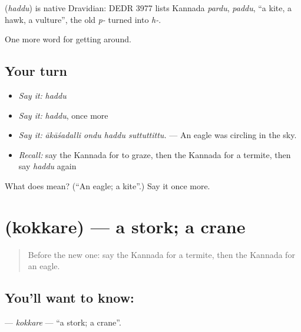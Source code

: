 \begin{cousinweb}
\textbf{} (\emph{haddu}) is native Dravidian: DEDR 3977 lists Kannada \emph{pardu}, \emph{paddu}, \textquotedblleft{}a kite, a hawk, a vulture\textquotedblright{}, the old \emph{p-} turned into \emph{h-}.
\end{cousinweb}

\begin{grammarlens}[title={What you've built}]
One more word for getting around.
\end{grammarlens}

\subsection*{Your turn}
\begin{itemize}
\raggedright
  \item \emph{Say it:} \emph{haddu}
  \item \emph{Say it:} \emph{haddu}, once more
  \item \emph{Say it:} \emph{ākāśadalli ondu haddu suttuttittu.} — An eagle was circling in the sky.
  \item \emph{Recall:} say the Kannada for to graze, then the Kannada for a termite, then say \emph{haddu} again
\end{itemize}

\begin{tcolorbox}[breakable,colback=teal!4,colframe=teal!35!black,title={Before you move on}]
What does  mean? (\textquotedblleft{}An eagle; a kite\textquotedblright{}.) Say it once more.
\end{tcolorbox}
\section[\texorpdfstring{\kn{ಕೊಕ್ಕರೆ} (kokkare)}{ಕೊಕ್ಕರೆ (kokkare)}]{ (kokkare) — a stork; a crane}

\label{lesson:KA-C478-kokkare}



\begin{quote}
Before the new one: say the Kannada for a termite, then the Kannada for an eagle.
\end{quote}

\subsection*{You'll want to know: }
\textbf{} — \emph{kokkare} — \textquotedblleft{}a stork; a crane\textquotedblright{}.

